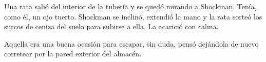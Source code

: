 Una rata salió del interior de la tubería y se quedó mirando a Shockman. Tenía, como él, un ojo tuerto. Shockman se inclinó, extendió la mano y la rata sorteó los surcos de ceniza del suelo para subirse a ella. La acarició con calma.

Aquella era una buena ocasión para escapar, sin duda, pensó dejándola de nuevo corretear por la pared exterior del almacén.
